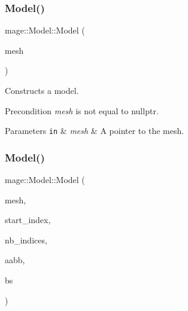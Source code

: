 \subsubsection{\texorpdfstring{Model()}{Model()}\hspace{0.1cm}{\footnotesize\ttfamily [1/4]}}
{\footnotesize\ttfamily mage\+::\+Model\+::\+Model (\begin{DoxyParamCaption}\item[{\hyperlink{namespacemage_a1e01ae66713838a7a67d30e44c67703e}{Shared\+Ptr}$<$ const \hyperlink{classmage_1_1_static_mesh}{Static\+Mesh} $>$}]{mesh }\end{DoxyParamCaption})\hspace{0.3cm}{\ttfamily [explicit]}}

Constructs a model.

\begin{DoxyPrecond}{Precondition}
{\itshape mesh} is not equal to {\ttfamily nullptr}. 
\end{DoxyPrecond}

\begin{DoxyParams}[1]{Parameters}
\mbox{\tt in}  & {\em mesh} & A pointer to the mesh. \\
\hline
\end{DoxyParams}
\hypertarget{classmage_1_1_model_aea937d2e26dc5549e1e93d1664b6f3b0}{}\label{classmage_1_1_model_aea937d2e26dc5549e1e93d1664b6f3b0} 
\subsubsection{\texorpdfstring{Model()}{Model()}\hspace{0.1cm}{\footnotesize\ttfamily [2/4]}}
{\footnotesize\ttfamily mage\+::\+Model\+::\+Model (\begin{DoxyParamCaption}\item[{\hyperlink{namespacemage_a1e01ae66713838a7a67d30e44c67703e}{Shared\+Ptr}$<$ const \hyperlink{classmage_1_1_mesh}{Mesh} $>$}]{mesh,  }\item[{size\+\_\+t}]{start\+\_\+index,  }\item[{size\+\_\+t}]{nb\+\_\+indices,  }\item[{const \hyperlink{structmage_1_1_a_a_b_b}{A\+A\+BB} \&}]{aabb,  }\item[{const \hyperlink{structmage_1_1_b_s}{BS} \&}]{bs }\end{DoxyParamCaption})\hspace{0.3cm}{\ttfamily [explicit]}}

